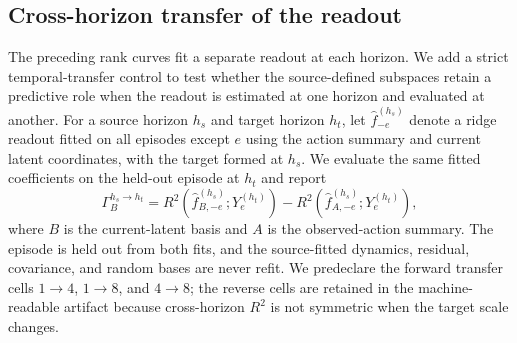 \documentclass{article}
\begin{document}
\subsection{Cross-horizon transfer of the readout}
\label{sec:supp-cross-horizon-readout}

The preceding rank curves fit a separate readout at each horizon. We add a
strict temporal-transfer control to test whether the source-defined
subspaces retain a predictive role when the readout is estimated at one
horizon and evaluated at another. For a source horizon $h_s$ and target
horizon $h_t$, let $\widehat f^{(h_s)}_{-e}$ denote a ridge readout fitted on
all episodes except $e$ using the action summary and current latent
coordinates, with the target formed at $h_s$. We evaluate the same fitted
coefficients on the held-out episode at $h_t$ and report
\begin{equation}
\Gamma_{B}^{h_s\!\to h_t}
 = R^2\!\left(\widehat f^{(h_s)}_{B,-e};Y^{(h_t)}_e\right)
 - R^2\!\left(\widehat f^{(h_s)}_{A,-e};Y^{(h_t)}_e\right),
\label{eq:supp-cross-horizon-readout}
\end{equation}
where $B$ is the current-latent basis and $A$ is the observed-action
summary. The episode is held out from both fits, and the source-fitted
dynamics, residual, covariance, and random bases are never refit. We
predeclare the forward transfer cells $1\!\to4$, $1\!\to8$, and $4\!\to8$;
the reverse cells are retained in the machine-readable artifact because
cross-horizon $R^2$ is not symmetric when the target scale changes.
\end{document}

